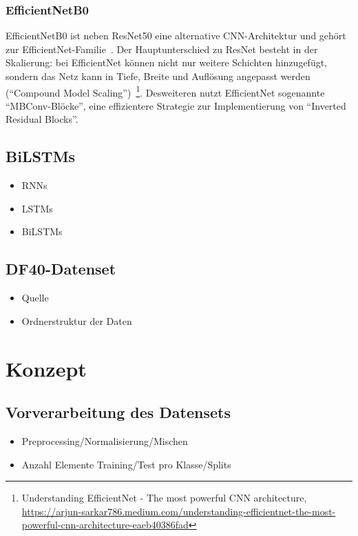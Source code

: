 \documentclass{article}
\begin{document}
    \subsubsection{EfficientNetB0}
    EfficientNetB0 ist neben ResNet50 eine alternative CNN-Architektur und gehört zur EfficientNet-Familie~\cite{efficientnet}.
    Der Hauptunterschied zu ResNet besteht in der Skalierung: bei EfficientNet können nicht nur weitere Schichten hinzugefügt, sondern das Netz kann in Tiefe, Breite und Auflösung angepasst werden (\enquote{Compound Model Scaling})~\footnote{Understanding EfficientNet - The most powerful CNN architecture, \url{https://arjun-sarkar786.medium.com/understanding-efficientnet-the-most-powerful-cnn-architecture-eaeb40386fad}}.
    Desweiteren nutzt EfficientNet sogenannte \enquote{MBConv-Blöcke}, eine effizientere Strategie zur Implementierung von \enquote{Inverted Residual Blocks}.
    \subsection{BiLSTMs}
    \begin{itemize}
        \item RNNs
        \item LSTMs
        \item BiLSTMs %
    \end{itemize}
    \subsection{DF40-Datenset}
    \begin{itemize}
        \item Quelle~\cite{yan2024df40}
        \item Ordnerstruktur der Daten
    \end{itemize}

    \newpage
    \section{Konzept}
    \subsection{Vorverarbeitung des Datensets}
    \begin{itemize}
        \item Preprocessing/Normalisierung/Mischen
        \item Anzahl Elemente Training/Test pro Klasse/Splits
    \end{itemize}
\end{document}

